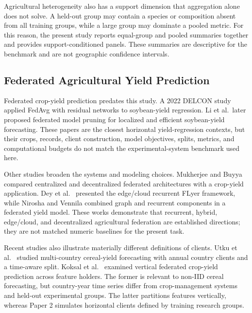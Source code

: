 \documentclass[journal]{IEEEtran}
\begin{document}
Agricultural heterogeneity also has a support dimension that aggregation alone
does not solve. A held-out group may contain a species or composition absent
from all training groups, while a large group may dominate a pooled metric.
For this reason, the present study reports equal-group and pooled summaries
together and provides support-conditioned panels. These summaries are
descriptive for the benchmark and are not geographic confidence intervals.

\subsection{Federated Agricultural Yield Prediction}

Federated crop-yield prediction predates this study. A 2022 DELCON study
\cite{delcon2022yield} applied FedAvg with residual networks to soybean-yield
regression. Li et al.\ later proposed federated model pruning
\cite{li2024pruning} for localized and efficient soybean-yield forecasting.
These papers are the closest horizontal yield-regression contexts, but their
crops, records, client construction, model objectives, splits, metrics, and
computational budgets do not match the experimental-system benchmark used here.

Other studies broaden the systems and modeling choices. Mukherjee and Buyya
\cite{mukherjee2025architectures} compared centralized and decentralized
federated architectures with a crop-yield application. Dey et al.\
\cite{dey2025flyer} presented the edge/cloud recurrent FLyer framework, while
Nirosha and Vennila \cite{nirosha2025enhancing} combined graph and recurrent
components in a federated yield model. These works demonstrate that recurrent,
hybrid, edge/cloud, and decentralized agricultural federation are established
directions; they are not matched numeric baselines for the present task.

Recent studies also illustrate materially different definitions of clients.
Utku et al.\ \cite{utku2026forecasting} studied multi-country cereal-yield
forecasting with annual country clients and a time-aware split. Koksal et al.\
\cite{koksal2026vertical} examined vertical federated crop-yield prediction
across feature holders. The former is relevant to non-IID cereal forecasting,
but country-year time series differ from crop-management systems and held-out
experimental groups. The latter partitions features vertically, whereas Paper 2
simulates horizontal clients defined by training research groups.
\end{document}
